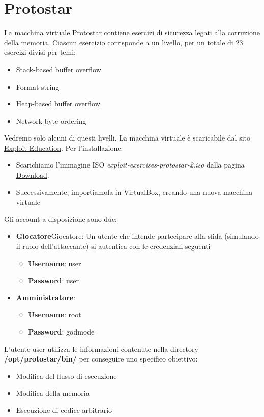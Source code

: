 \chapter{Protostar}
La macchina virtuale Protostar contiene esercizi di sicurezza legati alla corruzione della memoria. Ciascun esercizio corrisponde a un livello, per un totale di 23 esercizi divisi per temi:
\begin{itemize}
    \item Stack-based buffer overflow
    \item Format string
    \item Heap-based buffer overflow
    \item Network byte ordering
\end{itemize}
Vedremo solo alcuni di questi livelli.
La macchina virtuale è scaricabile dal sito \href{https://exploit.education/}{Exploit Education}.
Per l'installazione: 
\begin{itemize}
    \item Scarichiamo l'immagine ISO \textit{exploit-exercises-protostar-2.iso} dalla pagina \href{http://exploit.education/downloads/}{Download}.
    \item Successivamente, importiamola in VirtualBox, creando una nuova macchina virtuale
\end{itemize}
Gli account a disposizione sono due:
    \begin{itemize}
        \item \textbf{Giocatore}Giocatore: Un utente che intende partecipare alla sfida (simulando il ruolo dell’attaccante) si autentica con le credenziali seguenti
        \begin{itemize}
            \item \textbf{Username}: user
            \item \textbf{Password}: user
        \end{itemize}
        \item \textbf{Amministratore}:
        \begin{itemize}
            \item \textbf{Username}: root
            \item \textbf{Password}: godmode
        \end{itemize}
    \end{itemize}
    L'utente user utilizza le informazioni contenute nella directory \textbf{/opt/protostar/bin/} per conseguire uno specifico obiettivo:
    \begin{itemize}
        \item Modifica del flusso di esecuzione
        \item Modifica della memoria
        \item Esecuzione di codice arbitrario
    \end{itemize}
